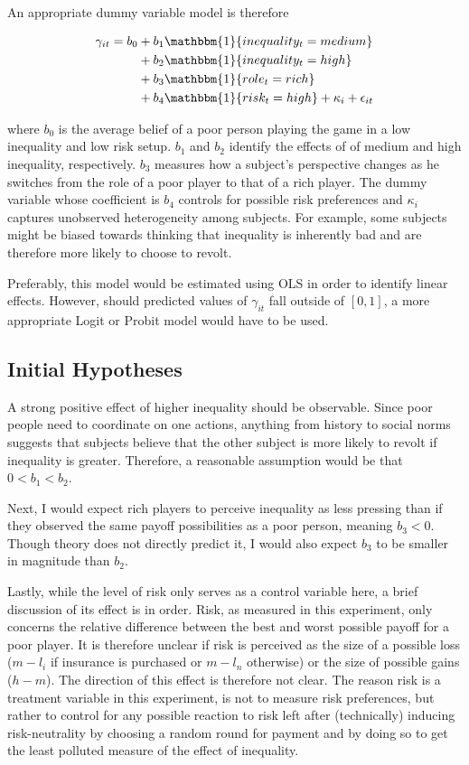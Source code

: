 \documentclass[12pt]{article}
\begin{document}
	An appropriate dummy variable model is therefore
	
	\begin{align*}
		\gamma_{it} = b_0 &+ b_1\mathbbm{1}\{inequality_t=medium\}\\
		&+ b_2\mathbbm{1}\{inequality_t=high\}\\
		&+ b_3\mathbbm{1}\{role_t=rich\}\\
		&+ b_4\mathbbm{1}\{risk_t=high\} + \kappa_i + \epsilon_{it}
	\end{align*}
	
	where $b_0$ is the average belief of a poor person playing the game in a 
	low inequality and low risk setup. $b_1$ and $b_2$ identify the effects of 
	of medium and high inequality, respectively. $b_3$ measures how a subject's 
	perspective changes as he switches from the role of a poor player to that 
	of a rich player. The dummy variable whose coefficient is $b_4$ controls 
	for possible risk preferences and $\kappa_i$ captures unobserved 
	heterogeneity among subjects. For example, some subjects might be biased 
	towards thinking that inequality is inherently bad and are therefore more 
	likely to choose to revolt.
	
	Preferably, this model would be estimated using OLS in order to identify 
	linear effects. However, should predicted values of $\gamma_{it}$ fall 
	outside of $[0,1]$, a more appropriate Logit or Probit model would have to 
	be used.
	
	\subsection{Initial Hypotheses}
	A strong positive effect of higher inequality should be observable. Since 
	poor people need to coordinate on one actions, anything from history to 
	social norms suggests that subjects believe that the other subject is more 
	likely to revolt if inequality is greater. Therefore, a reasonable 
	assumption would be that $0<b_1<b_2$.
	
	Next, I would expect rich players to perceive inequality as less pressing 
	than if they observed the same payoff possibilities as a poor person, 
	meaning $b_3<0$. Though theory does not directly predict it, I would also 
	expect $b_3$ to be smaller in magnitude than $b_2$.
	
	Lastly, while the level of risk only serves as a control variable here, a 
	brief discussion of its effect is in order. Risk, as measured in this 
	experiment, only concerns the relative difference between the best and 
	worst possible payoff for a poor player. It is therefore unclear if risk is 
	perceived as the size of a possible loss ($m-l_i$ if insurance is purchased 
	or $m-l_n$ otherwise) or the size of possible gains ($h-m$). The direction 
	of this effect is therefore not clear. The reason risk is a treatment 
	variable in this experiment, is not to measure risk preferences, but rather 
	to control for any possible reaction to risk left after (technically) 
	inducing risk-neutrality by choosing a random round for payment and by 
	doing so to get the least polluted measure of the effect of inequality.
	
\end{document}
